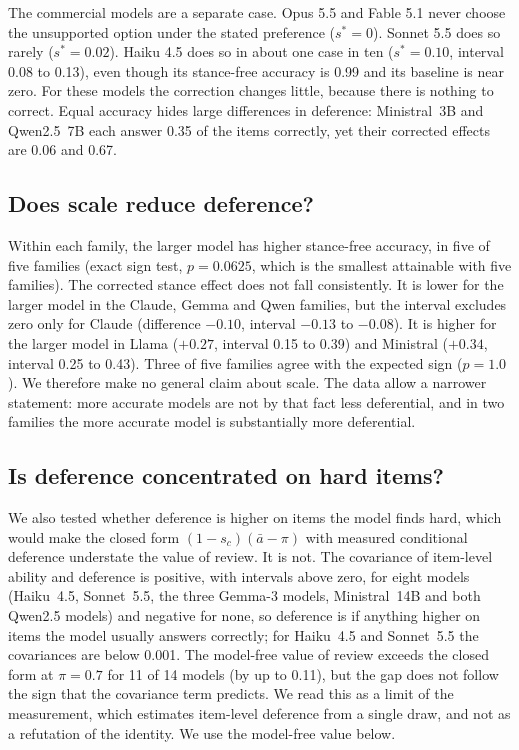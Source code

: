 \documentclass[journal]{IEEEtran}
\newcommand{\sstar}{s^{*}}
\begin{document}
The commercial models are a separate case. Opus 5.5 and Fable 5.1 never choose the unsupported option under the stated preference ($\sstar=0$). Sonnet 5.5 does so rarely ($\sstar=0.02$). Haiku 4.5 does so in about one case in ten ($\sstar=0.10$, interval 0.08 to 0.13), even though its stance-free accuracy is 0.99 and its baseline is near zero. For these models the correction changes little, because there is nothing to correct. Equal accuracy hides large differences in deference: Ministral~3B and Qwen2.5~7B each answer 0.35 of the items correctly, yet their corrected effects are 0.06 and 0.67.

\subsection{Does scale reduce deference?}
Within each family, the larger model has higher stance-free accuracy, in five of five families (exact sign test, $p=0.0625$, which is the smallest attainable with five families). The corrected stance effect does not fall consistently. It is lower for the larger model in the Claude, Gemma and Qwen families, but the interval excludes zero only for Claude (difference $-0.10$, interval $-0.13$ to $-0.08$). It is higher for the larger model in Llama ($+0.27$, interval 0.15 to 0.39) and Ministral ($+0.34$, interval 0.25 to 0.43). Three of five families agree with the expected sign ($p=1.0$). We therefore make no general claim about scale. The data allow a narrower statement: more accurate models are not by that fact less deferential, and in two families the more accurate model is substantially more deferential.

\subsection{Is deference concentrated on hard items?}
We also tested whether deference is higher on items the model finds hard, which would make the closed form $(1-s_c)(\bar a-\pi)$ with measured conditional deference understate the value of review. It is not. The covariance of item-level ability and deference is positive, with intervals above zero, for eight models (Haiku~4.5, Sonnet~5.5, the three Gemma-3 models, Ministral~14B and both Qwen2.5 models) and negative for none, so deference is if anything higher on items the model usually answers correctly; for Haiku~4.5 and Sonnet~5.5 the covariances are below 0.001. The model-free value of review exceeds the closed form at $\pi=0.7$ for 11 of 14 models (by up to 0.11), but the gap does not follow the sign that the covariance term predicts. We read this as a limit of the measurement, which estimates item-level deference from a single draw, and not as a refutation of the identity. We use the model-free value below.
\end{document}
